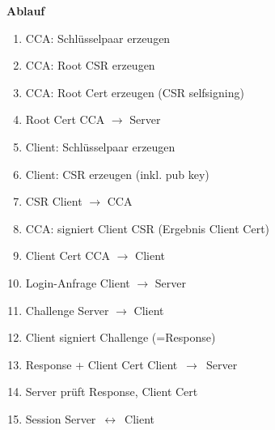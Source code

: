 \documentclass[aspectratio=169]{beamer}
\begin{document}
\begin{frame}[fragile]{\insertsection}{\insertsubsection}

\textbf{Ablauf}

\begin{multicols}{2}
	\begin{enumerate}
		\item CCA: Schlüsselpaar erzeugen
		\item CCA: Root CSR erzeugen
		\item CCA: Root Cert erzeugen (CSR selfsigning)
		\item Root Cert CCA $\rightarrow$ Server
		\item Client: Schlüsselpaar erzeugen
		\item Client: CSR erzeugen (inkl. pub key)
		\item CSR Client $\rightarrow$ CCA
		\item CCA: signiert Client CSR (Ergebnis Client Cert)
		\item Client Cert CCA $\rightarrow$ Client
		\item Login-Anfrage Client $\rightarrow$ Server
		\item Challenge Server $\rightarrow$ Client
		\item Client signiert Challenge (=Response)
		\item Response + Client Cert Client~$\rightarrow$~Server
		\item Server prüft Response, Client Cert
		\item Session Server~$\leftrightarrow$~Client
	\end{enumerate}
\end{multicols}
\end{frame}
\end{document}
